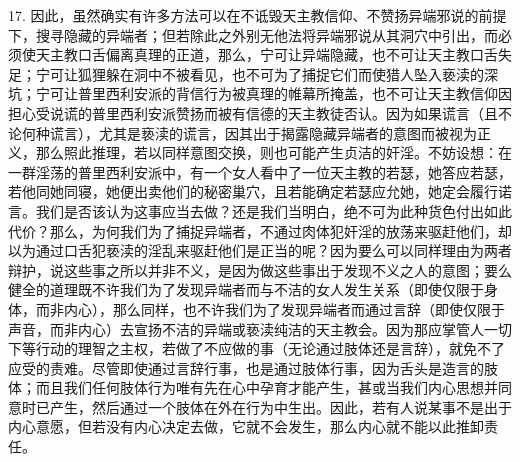 17. 因此，虽然确实有许多方法可以在不诋毁天主教信仰、不赞扬异端邪说的前提下，搜寻隐藏的异端者；但若除此之外别无他法将异端邪说从其洞穴中引出，而必须使天主教口舌偏离真理的正道，那么，宁可让异端隐藏，也不可让天主教口舌失足；宁可让狐狸躲在洞中不被看见，也不可为了捕捉它们而使猎人坠入亵渎的深坑；宁可让普里西利安派的背信行为被真理的帷幕所掩盖，也不可让天主教信仰因担心受说谎的普里西利安派赞扬而被有信德的天主教徒否认。因为如果谎言（且不论何种谎言），尤其是亵渎的谎言，因其出于揭露隐藏异端者的意图而被视为正义，那么照此推理，若以同样意图交换，则也可能产生贞洁的奸淫。不妨设想：在一群淫荡的普里西利安派中，有一个女人看中了一位天主教的若瑟，她答应若瑟，若他同她同寝，她便出卖他们的秘密巢穴，且若能确定若瑟应允她，她定会履行诺言。我们是否该认为这事应当去做？还是我们当明白，绝不可为此种货色付出如此代价？那么，为何我们为了捕捉异端者，不通过肉体犯奸淫的放荡来驱赶他们，却以为通过口舌犯亵渎的淫乱来驱赶他们是正当的呢？因为要么可以同样理由为两者辩护，说这些事之所以并非不义，是因为做这些事出于发现不义之人的意图；要么健全的道理既不许我们为了发现异端者而与不洁的女人发生关系（即使仅限于身体，而非内心），那么同样，也不许我们为了发现异端者而通过言辞（即使仅限于声音，而非内心）去宣扬不洁的异端或亵渎纯洁的天主教会。因为那应掌管人一切下等行动的理智之主权，若做了不应做的事（无论通过肢体还是言辞），就免不了应受的责难。尽管即使通过言辞行事，也是通过肢体行事，因为舌头是造言的肢体；而且我们任何肢体行为唯有先在心中孕育才能产生，甚或当我们内心思想并同意时已产生，然后通过一个肢体在外在行为中生出。因此，若有人说某事不是出于内心意愿，但若没有内心决定去做，它就不会发生，那么内心就不能以此推卸责任。\par

